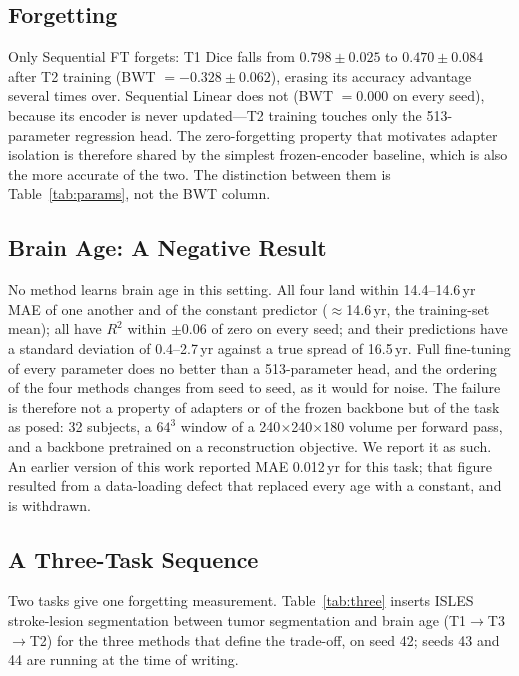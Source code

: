 \documentclass[journal,twoside,web]{ieeecolor}
\begin{document}
\subsection{Forgetting}
\label{sec:res_forgetting}

Only Sequential FT forgets: T1 Dice falls from $0.798\pm0.025$ to $0.470\pm0.084$ after T2 training (BWT $=-0.328\pm0.062$), erasing its accuracy advantage several times over. Sequential Linear does not (BWT $=0.000$ on every seed), because its encoder is never updated---T2 training touches only the 513-parameter regression head. The zero-forgetting property that motivates adapter isolation is therefore shared by the simplest frozen-encoder baseline, which is also the more accurate of the two. The distinction between them is Table~\ref{tab:params}, not the BWT column.

\subsection{Brain Age: A Negative Result}
\label{sec:res_age}

No method learns brain age in this setting. All four land within 14.4--14.6\,yr MAE of one another and of the constant predictor ($\approx$14.6\,yr, the training-set mean); all have $R^2$ within $\pm0.06$ of zero on every seed; and their predictions have a standard deviation of 0.4--2.7\,yr against a true spread of 16.5\,yr. Full fine-tuning of every parameter does no better than a 513-parameter head, and the ordering of the four methods changes from seed to seed, as it would for noise. The failure is therefore not a property of adapters or of the frozen backbone but of the task as posed: 32 subjects, a $64^3$ window of a 240$\times$240$\times$180 volume per forward pass, and a backbone pretrained on a reconstruction objective. We report it as such. An earlier version of this work reported MAE 0.012\,yr for this task; that figure resulted from a data-loading defect that replaced every age with a constant, and is withdrawn.

\subsection{A Three-Task Sequence}
\label{sec:res_three}

Two tasks give one forgetting measurement. Table~\ref{tab:three} inserts ISLES stroke-lesion segmentation between tumor segmentation and brain age (T1$\to$T3$\to$T2) for the three methods that define the trade-off, on seed 42; seeds 43 and 44 are running at the time of writing.
\end{document}
